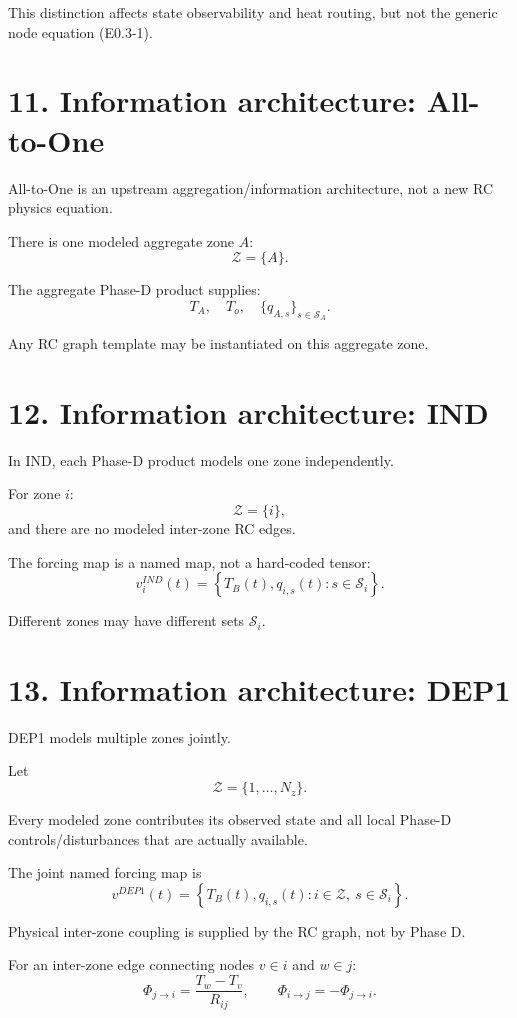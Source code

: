 \documentclass[11pt]{article}
\newcommand{\Zset}{\mathcal{Z}}
\begin{document}
This distinction affects state observability and heat routing, but not the
generic node equation (E0.3-1).

\section*{11. Information architecture: All-to-One}

All-to-One is an upstream aggregation/information architecture, not a new RC
physics equation.

There is one modeled aggregate zone $A$:
\[
\Zset=\{A\}.
\]

The aggregate Phase-D product supplies:
\[
T_A,\quad T_o,\quad
\{q_{A,s}\}_{s\in\mathcal{S}_A}.
\]

Any RC graph template may be instantiated on this aggregate zone.

\section*{12. Information architecture: IND}

In IND, each Phase-D product models one zone independently.

For zone $i$:
\[
\Zset=\{i\},
\]
and there are no modeled inter-zone RC edges.

The forcing map is a named map, not a hard-coded tensor:
\[
\boxed{
v_i^{IND}(t)
=
\left\{
T_B(t),
q_{i,s}(t):
s\in\mathcal{S}_i
\right\}.
}
\tag{E0.3-10}
\]

Different zones may have different sets $\mathcal{S}_i$.

\section*{13. Information architecture: DEP1}

DEP1 models multiple zones jointly.

Let
\[
\Zset=\{1,\ldots,N_z\}.
\]

Every modeled zone contributes its observed state and all local Phase-D
controls/disturbances that are actually available.

The joint named forcing map is
\[
\boxed{
v^{DEP1}(t)
=
\left\{
T_B(t),
q_{i,s}(t):
i\in\Zset,\ s\in\mathcal{S}_i
\right\}.
}
\tag{E0.3-11}
\]

Physical inter-zone coupling is supplied by the RC graph, not by Phase D.

For an inter-zone edge connecting nodes $v\in i$ and $w\in j$:
\[
\boxed{
\Phi_{j\rightarrow i}
=
\frac{T_w-T_v}{R_{ij}},
\qquad
\Phi_{i\rightarrow j}
=
-\Phi_{j\rightarrow i}.
}
\tag{E0.3-12}
\]
\end{document}
